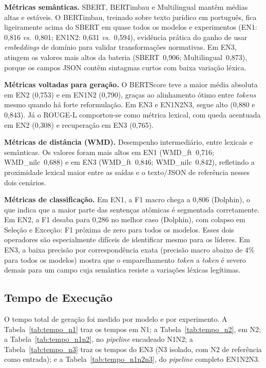 \documentclass[a4paper,fleqn]{cas-sc}
\begin{document}
\textbf{Métricas semânticas.} SBERT, BERTimbau e Multilingual mantêm médias altas e estáveis. O BERTimbau, treinado sobre texto jurídico em português, fica ligeiramente acima do SBERT em quase todos os modelos e experimentos (EN1: 0{,}816 \textit{vs.}~0{,}801; EN1N2: 0{,}631 \textit{vs.}~0{,}594), evidência prática do ganho de usar \textit{embeddings} de domínio para validar transformações normativas. Em EN3, atingem os valores mais altos da bateria (SBERT~0{,}906; Multilingual~0{,}873), porque os campos JSON contêm sintagmas curtos com baixa variação léxica.

\textbf{Métricas voltadas para geração.} O BERTScore teve a maior média absoluta em EN2 (0{,}753) e em EN1N2 (0{,}790), graças ao alinhamento ótimo entre \textit{tokens} mesmo quando há forte reformulação. Em EN3 e EN1N2N3, segue alto (0{,}880 e 0{,}843). Já o ROUGE-L comportou-se como métrica lexical, com queda acentuada em EN2 (0{,}308) e recuperação em EN3 (0{,}765).

\textbf{Métricas de distância (WMD).} Desempenho intermediário, entre lexicais e semânticas. Os valores foram mais altos em EN1 (WMD\_ft~0{,}716; WMD\_nilc~0{,}688) e em EN3 (WMD\_ft~0{,}846; WMD\_nilc~0{,}842), refletindo a proximidade lexical maior entre as saídas e o texto/JSON de referência nesses dois cenários.

\textbf{Métricas de classificação.} Em EN1, a F1 macro chega a 0{,}806 (Dolphin), o que indica que a maior parte das sentenças atômicas é segmentada corretamente. Em EN2, a F1 desaba para 0{,}286 no melhor caso (Dolphin), com colapso em Seleção e Exceção: F1 próxima de zero para todos os modelos. Esses dois operadores são especialmente difíceis de identificar mesmo para os líderes. Em EN3, a baixa precisão por correspondência exata (precisão macro abaixo de 4\% para todos os modelos) mostra que o emparelhamento \textit{token} a \textit{token} é severo demais para um campo cuja semântica resiste a variações léxicas legítimas.

\subsection{Tempo de Execução}
\label{sec:tempo}

O tempo total de geração foi medido por modelo e por experimento. A Tabela~\ref{tab:tempo_n1} traz os tempos em N1; a Tabela~\ref{tab:tempo_n2}, em N2; a Tabela~\ref{tab:tempo_n1n2}, no \textit{pipeline} encadeado N1N2; a Tabela~\ref{tab:tempo_n3} traz os tempos do EN3 (N3 isolado, com N2 de referência como entrada); e a Tabela~\ref{tab:tempo_n1n2n3}, do \textit{pipeline} completo EN1N2N3.
\end{document}
